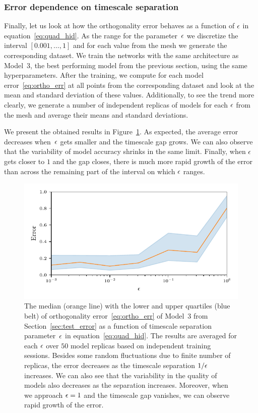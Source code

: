 \documentclass{article}
\begin{document}
\subsubsection{Error dependence on timescale separation}
\label{sec:err_vs_eps}

Finally, let us look at how the orthogonality error behaves as a function of $\epsilon$ in equation~\eqref{eq:quad_hid}. As the range for the parameter~$\epsilon$ we discretize the interval $[0.001,\dotsc,1]$ and for each value from the mesh we generate the corresponding dataset. We train the networks with the same architecture as Model~3, the best performing model from the previous section, using the same hyperparameters. After the training, we compute for each model error~\eqref{eq:ortho_err} at all points from the corresponding dataset and look at the mean and standard deviation of these values. Additionally, to see the trend more clearly, we generate a number of independent replicas of models for each $\epsilon$ from the mesh and average their means and standard deviations.

We present the obtained results in Figure~\ref{fig:quad4d_eps_err_derivatives}. As expected, the average error decreases when~$\epsilon$ gets smaller and the timescale gap grows. We can also observe that the variability of model accuracy shrinks in the same limit. Finally, when $\epsilon$ gets closer to $1$ and the gap closes, there is much more rapid growth of the error than across the remaining part of the interval on which $\epsilon$ ranges.

\begin{figure}
    \centering
    \includegraphics[]{figs/quad4d_eps_err_derivatives.pdf}
    \caption{
    The median (orange line) with the lower and upper quartiles (blue belt) of orthogonality error~\eqref{eq:ortho_err} of Model~3 from Section~\ref{sec:test_error} as a function of timescale separation parameter~$\epsilon$ in equation~\eqref{eq:quad_hid}. The results are averaged for each $\epsilon$ over $50$ model replicas based on independent training sessions. Besides some random fluctuations due to finite number of replicas, the error decreases as the timescale separation $1/\epsilon$ increases. We can also see that the variability in the quality of models also decreases as the separation increases. Moreover, when we approach $\epsilon=1$ and the timescale gap vanishes, we can observe rapid growth of the error.
    }
    \label{fig:quad4d_eps_err_derivatives}
\end{figure}
\end{document}
